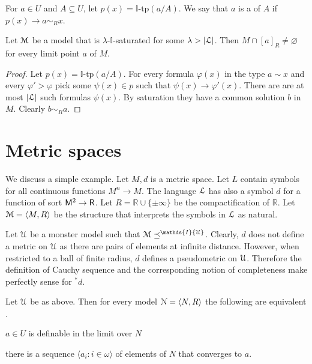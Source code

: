 \documentclass[11pt,oneside]{amsart}
\newcommand{\mylabel}[1]{{#1}\hfill}
\renewenvironment{itemize}
  {\begin{list}{$\cdot$}{%
  \setlength{\parskip}{0mm}
  \setlength{\topsep}{.2\baselineskip}
  \setlength{\rightmargin}{0mm}
  \setlength{\listparindent}{0mm}
  \setlength{\itemindent}{0mm}
  \setlength{\labelwidth}{3ex}
  \setlength{\itemsep}{.2\baselineskip}
  \setlength{\parsep}{.2\baselineskip}
  \setlength{\partopsep}{0mm}
  \setlength{\labelsep}{1ex}
  \setlength{\leftmargin}{\labelwidth+\labelsep}
  \let\makelabel\mylabel}}{%
\end{list}}
\renewcommand*{\emph}[1]{%
   \smash{\tikz[baseline]\node[rectangle, fill=teal!25, rounded corners, inner xsep=0.5ex, inner ysep=0.2ex, anchor=base, minimum height = 2.7ex]{#1};}}
\begin{document}
For $a\in U$ and $A\subseteq U$, let $p(x)=\mathds{I}\mbox{-tp}(a/A)$.
We say that $a$ is a \emph{limit point\/} of $A$ if $p(x)\rightarrow a\sim_{\!R} x$.

\begin{fact}
  Let ${\EuScript M}$ be a model that is $\lambda$-$\mathds{I}$-saturated for some $\lambda>|{\EuScript L}|$.
  Then $M\cap[a]_{\!R}\neq\varnothing$ for every limit point $a$ of $M$.
\end{fact}

\begin{proof}
  Let $p(x)=\mathds{I}\mbox{-tp}(a/A)$.
  For every formula $\varphi(x)$ in the type $a\sim x$ and every $\varphi'>\varphi$ pick some $\psi(x)\in p$ such that $\psi(x)\rightarrow\varphi'(x)$.
  There are are at most $|{\EuScript L}|$ such formulas $\psi(x)$.
  By saturation they have a common solution $b$ in $M$.
  Clearly $b\sim_{\!R}a$. 
\end{proof}



\section{Metric spaces}

We discuss a simple example.
Let $M,d$ is a metric space.
Let $L$ contain symbols for all continuous functions $M^n\to M$.
The language ${\EuScript L}$ has also a symbol $d$ for a function of sort ${\sf M}^2\to {\sf R}$.
Let $R=\mathds{R}\cup\{\pm\infty\}$ be the compactification of $\mathds{R}$.
Let ${\EuScript M}=\langle M,R\rangle$ be the structure that interprets the symbols in ${\EuScript L}$ as natural.

Let ${\EuScript U}$ be a monster model such that ${\EuScript M}\preceq^\mathds{I}{\EuScript U}$.
Clearly, $d$ does not define a metric on ${\EuScript U}$ as there are pairs of elements at infinite distance.
However, when restricted to a ball of finite radius, $d$ defines a pseudometric on  ${\EuScript U}$.
Therefore the definition of Cauchy sequence and the corresponding notion of completeness make perfectly sense for ${}^*\!d$.

\begin{fact}
  Let $ {\EuScript U}$ be as above.
  Then for every model ${\EuScript N}=\langle N,R\rangle$ the following are equivalent 
  \begin{itemize}
    \item[1.] $a\in U$ is definable in the limit over $N$
    \item[2.] there is a sequence $\langle a_i: i\in\omega\rangle$ of elements of $N$ that converges to $a$.
  \end{itemize} 
\end{fact}
\end{document}
